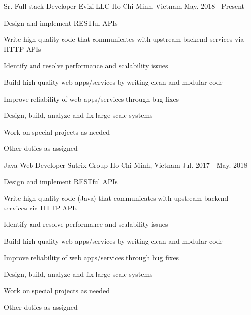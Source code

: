 

\begin{cventries}

  \cventry
    {Sr. Full-stack Developer} %
    {Evizi LLC} %
    {Ho Chi Minh, Vietnam} %
    {May. 2018 - Present} %
    {
      \begin{cvitems} %
        \item {Design and implement RESTful APIs}
        \item {Write high-quality code that communicates with upstream backend services via HTTP APIs}
        \item {Identify and resolve performance and scalability issues}
        \item {Build high-quality web apps/services by writing clean and modular code}
        \item {Improve reliability of web apps/services through bug fixes}
        \item {Design, build, analyze and fix large-scale systems}
        \item {Work on special projects as needed}
        \item {Other duties as assigned}
      \end{cvitems}
    }

  \cventry
    {Java Web Developer} %
    {Sutrix Group} %
    {Ho Chi Minh, Vietnam} %
    {Jul. 2017 - May. 2018} %
    {
      \begin{cvitems} %
        \item {Design and implement RESTful APIs}
        \item {Write high-quality code (Java) that communicates with upstream backend services via HTTP APIs}
        \item {Identify and resolve performance and scalability issues}
        \item {Build high-quality web apps/services by writing clean and modular code}
        \item {Improve reliability of web apps/services through bug fixes}
        \item {Design, build, analyze and fix large-scale systems}
        \item {Work on special projects as needed}
        \item {Other duties as assigned}
      \end{cvitems}
    }


\end{cventries}
